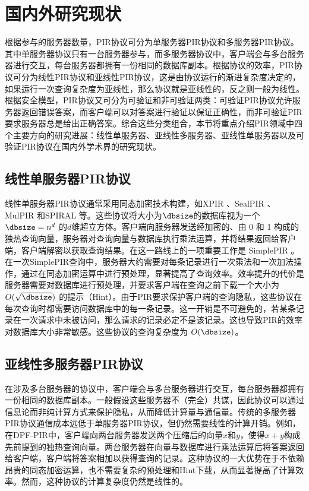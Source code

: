 \section{国内外研究现状}

根据参与的服务器数量，PIR协议可分为单服务器PIR协议和多服务器PIR协议。其中单服务器协议只有一台服务器参与，而多服务器协议中，客户端会与多台服务器进行交互，每台服务器都拥有一份相同的数据库副本。根据协议的效率，PIR协议可分为线性PIR协议和亚线性PIR协议，这是由协议运行的渐进复杂度决定的，如果运行一次查询复杂度为亚线性，那么协议就是亚线性的，反之则一般为线性。根据安全模型，PIR协议又可分为可验证和非可验证两类：可验证PIR协议允许服务器返回错误答案，而客户端可以对答案进行验证以保证正确性，而非可验证PIR要求服务器总是给出正确答案。综合这些分类组合，本节将重点介绍PIR领域中四个主要方向的研究进展：线性单服务器、亚线性多服务器、亚线性单服务器以及可验证PIR协议在国内外学术界的研究现状。

\subsection{线性单服务器PIR协议}
线性单服务器PIR协议通常采用同态加密技术构建，如XPIR \cite{EPRINT:ABFK14}、SealPIR \cite{SP:ACLS18}、MulPIR \cite{USENIX:ALPRSSY21} 和SPIRAL \cite{SP:MenWu22} 等。这些协议将大小为$\dbsize$的数据库视为一个 $\dbsize = n^d$ 的$d$维超立方体。客户端向服务器发送经加密的、由 0 和 1 构成的独热查询向量，服务器对查询向量与数据库执行乘法运算，并将结果返回给客户端，客户端解密以获取查询结果。在这一路线上的一项重要工作是 SimplePIR \cite{SimplePIR}。在一次SimplePIR查询中，服务器大约需要对每条记录进行一次乘法和一次加法操作，通过在同态加密运算中进行预处理，显著提高了查询效率。效率提升的代价是服务器需要对数据库进行预处理，并要求客户端在查询之前下载一个大小为 $O(\sqrt{\dbsize})$ 的提示（Hint）。由于PIR要求保护客户端的查询隐私，这些协议在每次查询时都需要访问数据库中的每一条记录。这一开销是不可避免的，若某条记录在一次请求中未被访问，那么请求的记录必定不是该记录。这也导致PIR的效率对数据库大小非常敏感。这些协议的查询复杂度为 $O(\dbsize)$。

\subsection{亚线性多服务器PIR协议}

在涉及多台服务器的协议中，客户端会与多台服务器进行交互，每台服务器都拥有一份相同的数据库副本。一般假设这些服务器不（完全）共谋，因此协议可以通过信息论而非纯计算方式来保护隐私，从而降低计算量与通信量。传统的多服务器PIR协议通信成本远低于单服务器PIR协议，但仍然需要线性的计算开销。例如，在DPF-PIR\cite{DPF-PIR}中，客户端向两台服务器发送两个压缩后的向量$x$和$y$，使得$x + y$构成先前提到的独热查询向量。两台服务器在向量与数据库进行乘法运算后将答案返回给客户端，客户端将答案相加以获得查询的记录。这种协议的一大优势在于不依赖昂贵的同态加密运算，也不需要复杂的预处理和Hint下载，从而显著提高了计算效率。然而，这种协议的计算复杂度仍然是线性的。

